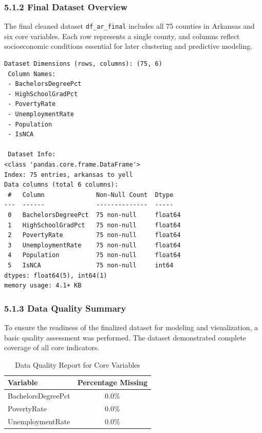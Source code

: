 \documentclass{llncs}
\begin{document}
\subsubsection{5.1.2 Final Dataset Overview}

The final cleaned dataset \texttt{df\_ar\_final} includes all 75 counties in Arkansas and six core variables. Each row represents a single county, and columns reflect socioeconomic conditions essential for later clustering and predictive modeling.

\begin{verbatim}
Dataset Dimensions (rows, columns): (75, 6)
 Column Names:
 - BachelorsDegreePct
 - HighSchoolGradPct
 - PovertyRate
 - UnemploymentRate
 - Population
 - IsNCA

 Dataset Info:
<class 'pandas.core.frame.DataFrame'>
Index: 75 entries, arkansas to yell
Data columns (total 6 columns):
 #   Column              Non-Null Count  Dtype  
---  ------              --------------  -----  
 0   BachelorsDegreePct  75 non-null     float64
 1   HighSchoolGradPct   75 non-null     float64
 2   PovertyRate         75 non-null     float64
 3   UnemploymentRate    75 non-null     float64
 4   Population          75 non-null     float64
 5   IsNCA               75 non-null     int64  
dtypes: float64(5), int64(1)
memory usage: 4.1+ KB
\end{verbatim}

\subsubsection{5.1.3 Data Quality Summary}

To ensure the readiness of the finalized dataset for modeling and visualization, a basic quality assessment was performed. The dataset demonstrated complete coverage of all core indicators.

\begin{table}[H]
\centering
\caption{Data Quality Report for Core Variables}
\label{tab:data_quality}
\begin{tabular}{l c}
\toprule
\textbf{Variable} & \textbf{Percentage Missing} \\
\midrule
BachelorsDegreePct & 0.0\% \\
PovertyRate        & 0.0\% \\
UnemploymentRate   & 0.0\% \\
\bottomrule
\end{tabular}
\end{table}
\vspace{-1em}
\FloatBarrier
\end{document}
